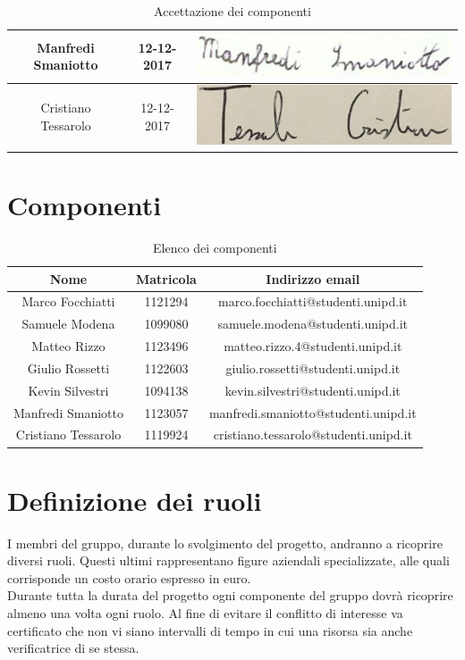 \documentclass[./PianodiProgetto.tex]{subfiles}
\begin{document}
\begin{table}[H]
\begin{tabular}{|c|c|c|}
		Manfredi Smaniotto& 12-12-2017 &\includegraphics[scale=0.5]{img/firme/SmaniottoManfredi} \\ \hline
		Cristiano Tessarolo& 12-12-2017 &\includegraphics[scale=0.5]{img/firme/TessaroloCristiano} \\  
		\hline
	\end{tabular}
	\caption{Accettazione dei componenti}
\end{table}

\section{Componenti}
\begin{table}[H]
	\begin{tabular}{|c|c|c|}
	\hline
	Nome&Matricola&Indirizzo email \\ \hline
	Marco Focchiatti&1121294&marco.focchiatti@studenti.unipd.it  \\ \hline
	Samuele Modena&1099080&samuele.modena@studenti.unipd.it \\ \hline
	Matteo Rizzo&1123496&matteo.rizzo.4@studenti.unipd.it \\ \hline
	Giulio Rossetti&1122603&giulio.rossetti@studenti.unipd.it \\ \hline
	Kevin Silvestri&1094138&kevin.silvestri@studenti.unipd.it \\ \hline
	Manfredi Smaniotto&1123057&manfredi.smaniotto@studenti.unipd.it \\ \hline
	Cristiano Tessarolo&1119924&cristiano.tessarolo@studenti.unipd.it \\  
	\hline
	\end{tabular}
\caption{Elenco dei componenti}
\end{table}

\section{Definizione dei ruoli}
I membri del gruppo, durante lo svolgimento del progetto, andranno a ricoprire diversi ruoli. Questi ultimi rappresentano figure aziendali specializzate, alle quali corrisponde un costo orario espresso in euro. \\
Durante tutta la durata del progetto ogni componente del gruppo dovrà ricoprire almeno una volta ogni ruolo. Al fine di evitare il conflitto di interesse va certificato che non vi siano intervalli di tempo in cui una risorsa sia anche verificatrice di se stessa.
\end{document}
